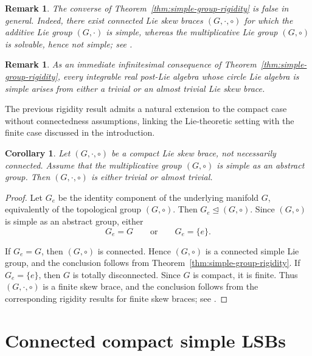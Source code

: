 \documentclass[reqno]{amsart}
\newtheorem{corollary}[theorem]{Corollary}
\newtheorem{remark}[theorem]{Remark}
\begin{document}
\begin{remark}\label{rem:additive-simple-not-multiplicative-simple}\rm
The converse of Theorem~\ref{thm:simple-group-rigidity} is false in general.
Indeed, there exist connected Lie skew braces $(G,\cdot,\circ)$ for which the
additive Lie group $(G,\cdot)$ is simple, whereas the multiplicative Lie group
$(G,\circ)$ is solvable, hence not simple; see \cite{DameleLoi2026}.
\end{remark}

\begin{remark}\label{rem:simple-integrable-PLA}\rm
As an immediate infinitesimal consequence of
Theorem~\ref{thm:simple-group-rigidity}, every integrable real post-Lie algebra
whose circle Lie algebra is simple arises from either a trivial or an almost
trivial Lie skew brace.
\end{remark}

The previous rigidity result admits a natural extension to the compact case
without connectedness assumptions, linking the Lie-theoretic setting with the
finite case discussed in the introduction.

\begin{corollary}\label{cor:compact-abstractly-simple}
Let $(G,\cdot,\circ)$ be a compact Lie skew brace, not necessarily connected.
Assume that the multiplicative group $(G,\circ)$ is simple as an abstract
group. Then $(G,\cdot,\circ)$ is either trivial or almost trivial.
\end{corollary}

\begin{proof}
Let $G_e$ be the identity component of the underlying manifold $G$,
equivalently of the topological group $(G,\circ)$. Then
$G_e\trianglelefteq (G,\circ)$.
Since $(G,\circ)$ is simple as an abstract group, either
\[
G_e=G
\qquad\text{or}\qquad
G_e=\{e\}.
\]

If $G_e=G$, then $(G,\circ)$ is connected. Hence $(G,\circ)$ is a connected
simple Lie group, and the conclusion follows from
Theorem~\ref{thm:simple-group-rigidity}.
If $G_e=\{e\}$, then $G$ is totally disconnected. Since $G$ is compact, it is
finite. Thus $(G,\cdot,\circ)$ is a finite skew brace, and the conclusion
follows from the corresponding rigidity results for finite skew braces; see
\cite{Byott2004,Byott2024,BBEJP}.
\end{proof}


\section{Connected compact simple LSBs}\label{sec:compact-simple}
\end{document}
